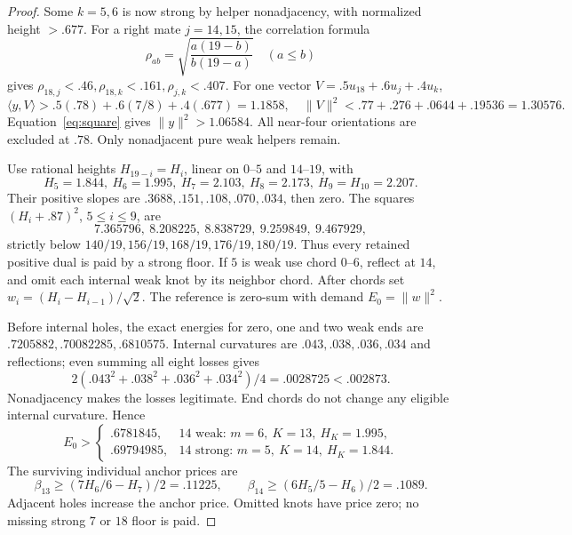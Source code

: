 \documentclass[11pt]{article}
\theoremstyle{definition}
\theoremstyle{remark}
\newcommand{\ip}[2]{\langle #1,#2\rangle}
\newcommand{\norm}[1]{\lVert #1\rVert}
\begin{document}
\begin{proof}
Some \(k=5,6\) is now strong by helper nonadjacency, with
normalized height \(>.677\).
For a right mate \(j=14,15\), the correlation formula
\[
 \rho_{ab}=\sqrt{\frac{a(19-b)}{b(19-a)}}\quad(a\leq b)
\]
gives \(\rho_{18,j}<.46,\rho_{18,k}<.161,\rho_{j,k}<.407\).
For one vector \(V=.5u_{18}+.6u_j+.4u_k\),
\[
 \ip{y}{V}>.5(.78)+.6(7/8)+.4(.677)=1.1858,\quad
 \norm{V}^2<.77+.276+.0644+.19536=1.30576.
\]
Equation~\eqref{eq:square} gives \(\norm{y}^2>1.06584\).
All near-four orientations are excluded at \(.78\).
Only nonadjacent pure weak helpers remain.

Use rational heights \(H_{19-i}=H_i\), linear on \(0\)--\(5\)
and \(14\)--\(19\), with
\[
 H_5=1.844,\ H_6=1.995,\ H_7=2.103,\ H_8=2.173,\
 H_9=H_{10}=2.207.
\]
Their positive slopes are \(.3688,.151,.108,.070,.034\),
then zero. The squares \((H_i+.87)^2\), \(5\leq i\leq9\), are
\[
 7.365796,\ 8.208225,\ 8.838729,\ 9.259849,\ 9.467929,
\]
strictly below \(140/19,156/19,168/19,176/19,180/19\).
Thus every retained positive dual is paid by a strong floor.
If \(5\) is weak use chord \(0\)--\(6\), reflect at \(14\),
and omit each internal weak knot by its neighbor chord.
After chords set \(w_i=(H_i-H_{i-1})/\sqrt2\).
The reference is zero-sum with demand \(E_0=\norm{w}^2\).

Before internal holes, the exact energies for zero, one and
two weak ends are \(.7205882,\allowbreak .70082285,\allowbreak .6810575\).
Internal curvatures are \(.043,\allowbreak .038,\allowbreak .036,\allowbreak .034\) and reflections;
even summing all eight losses gives
\[
 2(.043^2+.038^2+.036^2+.034^2)/4=.0028725<.002873.
\]
Nonadjacency makes the losses legitimate. End chords do not
change any eligible internal curvature. Hence
\begin{equation}
\label{eq:Alocalbase}
 E_0>
 \begin{cases}
 .6781845,&14\text{ weak: }m=6,\ K=13,\ H_K=1.995,\\
 .69794985,&14\text{ strong: }m=5,\ K=14,\ H_K=1.844.
 \end{cases}
\end{equation}
The surviving individual anchor prices are
\[
 \beta_{13}\geq(7H_6/6-H_7)/2=.11225,\qquad
 \beta_{14}\geq(6H_5/5-H_6)/2=.1089.
\]
Adjacent holes increase the anchor price. Omitted knots have
price zero; no missing strong \(7\) or \(18\) floor is paid.


\end{proof}
\end{document}
